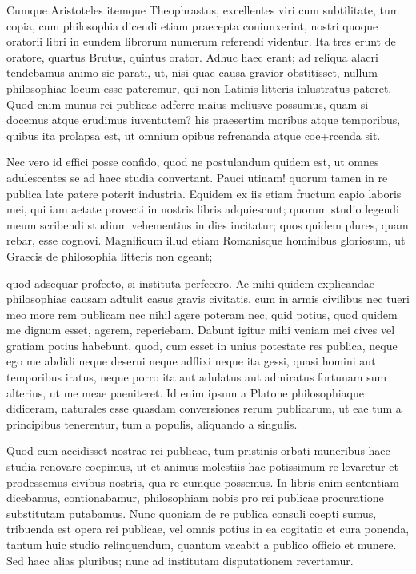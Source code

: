  Cumque Aristoteles itemque Theophrastus, excellentes viri cum subtilitate, tum copia, cum philosophia dicendi etiam praecepta coniunxerint, nostri quoque oratorii libri in eundem librorum numerum referendi videntur. Ita tres erunt de oratore, quartus Brutus, quintus orator. Adhuc haec erant; ad reliqua alacri tendebamus animo sic parati, ut, nisi quae causa gravior obstitisset, nullum philosophiae locum esse pateremur, qui non Latinis litteris inlustratus pateret. Quod enim munus rei publicae adferre maius meliusve possumus, quam si docemus atque erudimus iuventutem? his praesertim moribus atque temporibus, quibus ita prolapsa est, ut omnium opibus refrenanda atque coe+rcenda sit.

 Nec vero id effici posse confido, quod ne postulandum quidem est, ut omnes adulescentes se ad haec studia convertant. Pauci utinam! quorum tamen in re publica late patere poterit industria. Equidem ex iis etiam fructum capio laboris mei, qui iam aetate provecti in nostris libris adquiescunt; quorum studio legendi meum scribendi studium vehementius in dies incitatur; quos quidem plures, quam rebar, esse cognovi. Magnificum illud etiam Romanisque hominibus gloriosum, ut Graecis de philosophia litteris non egeant;

 quod adsequar profecto, si instituta perfecero. Ac mihi quidem explicandae philosophiae causam adtulit casus gravis civitatis, cum in armis civilibus nec tueri meo more rem publicam nec nihil agere poteram nec, quid potius, quod quidem me dignum esset, agerem, reperiebam. Dabunt igitur mihi veniam mei cives vel gratiam potius habebunt, quod, cum esset in unius potestate res publica, neque ego me abdidi neque deserui neque adflixi neque ita gessi, quasi homini aut temporibus iratus, neque porro ita aut adulatus aut admiratus fortunam sum alterius, ut me meae paeniteret. Id enim ipsum a Platone philosophiaque didiceram, naturales esse quasdam conversiones rerum publicarum, ut eae tum a principibus tenerentur, tum a populis, aliquando a singulis.

 Quod cum accidisset nostrae rei publicae, tum pristinis orbati muneribus haec studia renovare coepimus, ut et animus molestiis hac potissimum re levaretur et prodessemus civibus nostris, qua re cumque possemus. In libris enim sententiam dicebamus, contionabamur, philosophiam nobis pro rei publicae procuratione substitutam putabamus. Nunc quoniam de re publica consuli coepti sumus, tribuenda est opera rei publicae, vel omnis potius in ea cogitatio et cura ponenda, tantum huic studio relinquendum, quantum vacabit a publico officio et munere. Sed haec alias pluribus; nunc ad institutam disputationem revertamur.

